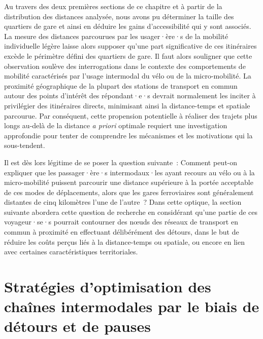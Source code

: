 \begin{refsegment}
Au travers des deux premières sections de ce chapitre et à partir de la distribution des distances analysée, nous avons pu déterminer la taille des quartiers de gare et ainsi en déduire les gains d'accessibilité qui y sont associés. La mesure des distances parcourues par les usager·ère·s de la mobilité individuelle légère laisse alors supposer qu'une part significative de ces itinéraires excède le périmètre défini des quartiers de gare. Il faut alors souligner que cette observation soulève des interrogations dans le contexte des comportements de mobilité caractérisés par l'usage intermodal du vélo ou de la micro-mobilité. La proximité géographique de la plupart des stations de transport en commun autour des points d'intérêt des répondant·e·s devrait normalement les inciter à privilégier des itinéraires directs, minimisant ainsi la distance-temps et spatiale parcourue. Par conséquent, cette propension potentielle à réaliser des trajets plus longs au-delà de la distance \textsl{a priori} optimale requiert une investigation approfondie pour tenter de comprendre les mécanismes et les motivations qui la sous-tendent.%

Il est dès lors légitime de se poser la question suivante~: Comment peut-on expliquer que les passager·ère·s intermodaux·les ayant recours au vélo ou à la micro-mobilité puissent parcourir une distance supérieure à la portée acceptable de ces modes de déplacements, alors que les gares ferroviaires sont généralement distantes de cinq kilomètres l'une de l'autre~? Dans cette optique, la section suivante abordera cette question de recherche en considérant qu'une partie de ces voyageur·se·s pourrait contourner des nœuds des réseaux de transport en commun à proximité en effectuant délibérément des détours, dans le but de réduire les coûts perçus liés à la distance-temps ou spatiale, ou encore en lien avec certaines caractéristiques territoriales.%

    \newpage
\section{Stratégies d'optimisation des chaînes intermodales par le biais de détours et de pauses
    \label{chap5:detours-pauses-optimisation}
    }


\end{refsegment}
